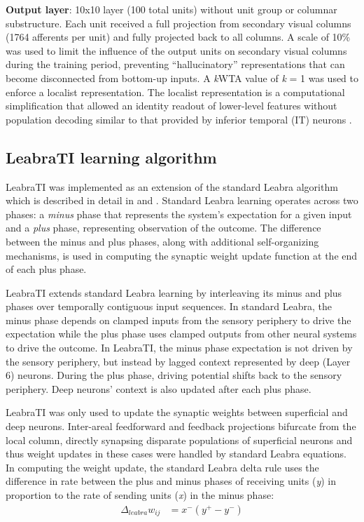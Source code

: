 \documentclass[dwyatte_dissertation.tex]{subfiles}
\begin{document}
\textbf{Output layer}: 10x10 layer (100 total units) without unit group or columnar substructure. Each unit received a full projection from secondary visual columns (1764 afferents per unit) and fully projected back to all columns. A scale of 10\% was used to limit the influence of the output units on secondary visual columns during the training period, preventing ``hallucinatory'' representations that can become disconnected from bottom-up inputs. A \textit{k}WTA value of \textit{k} = 1 was used to enforce a localist representation. The localist representation is a computational simplification that allowed an identity readout of lower-level features without population decoding similar to that provided by inferior temporal (IT) neurons \cite{HungKreimanPoggioEtAl05,LiCoxZoccolanEtAl09}. 

\subsection{LeabraTI learning algorithm}

LeabraTI was implemented as an extension of the standard Leabra algorithm which is described in detail in  and . Standard Leabra learning operates across two phases: a \textit{minus} phase that represents the system's expectation for a given input and a \textit{plus} phase, representing observation of the outcome. The difference between the minus and plus phases, along with additional self-organizing mechanisms, is used in computing the synaptic weight update function at the end of each plus phase. 

LeabraTI extends standard Leabra learning by interleaving its minus and plus phases over temporally contiguous input sequences. In standard Leabra, the minus phase depends on clamped inputs from the sensory periphery to drive the expectation while the plus phase uses clamped outputs from other neural systems to drive the outcome. In LeabraTI, the minus phase expectation is not driven by the sensory periphery, but instead by lagged context represented by deep (Layer 6) neurons. During the plus phase, driving potential shifts back to the sensory periphery. Deep neurons' context is also updated after each plus phase.

LeabraTI was only used to update the synaptic weights between superficial and deep neurons. Inter-areal feedforward and feedback projections bifurcate from the local column, directly synapsing disparate populations of superficial neurons and thus weight updates in these cases were handled by standard Leabra equations. In computing the weight update, the standard Leabra delta rule \cite{OReilly96} uses the difference in rate between the plus and minus phases of receiving units (\textit{y}) in proportion to the rate of sending units (\textit{x}) in the minus phase:
\begin{align*}
\Delta_{leabra} w_{ij} &= x^-(y^+ - y^-)
\end{align*}
\end{document}
